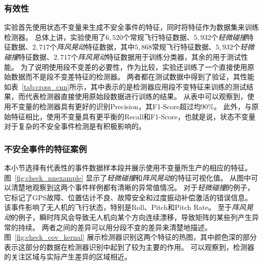 \subsubsection{有效性}  
实验首先使用状态不变量来生成不安全事件的特征，同时将特征作为数据集来训练检测器。
总体上讲，实验使用了$6,520$个常规飞行特征数据、$5,932$个\emph{轻微碰撞}特征数据、$2,717$个\emph{阵风晃动}特征数据，其中$5,868$常规飞行特征数据、$5,932$个\emph{轻微碰撞}特征数据、$2,717$个\emph{阵风晃动}特征数据用于训练分类器，其余的用于测试性能。
为了说明使用段不变差的必要性，作为比较，实验还训练了一个直接使用原始数据而不是段不变差特征的检测器。
两者都在测试数据中得到了验证，其性能如表~\ref{tab:cross_cnn}所示，其中表示的是检测器应用段不变特征来训练的测试结果，而代表检测器直接使用原始段数据进行训练的结果。
从表中可以观察到，使用不变量的检测器具有更好的识别Precision，其F1-Score超过均$90\%$。
此外，与原始特征相比，使用不变量具有更平衡的Recall和F1-Score，也就是说，状态不变量对于复杂的不安全事件检测是有积极影响的。



\subsubsection{不安全事件的特征案例}
本小节选择有代表性的事件数据样本段并展示使用不变量所生产的相应的特征。
图~\ref{fig:check_nnexample} 显示了\emph{轻微碰撞}和\emph{阵风晃动}的特征可视化值。
从图中可以清楚地观察到这两个事件样例都有清晰的异常值情况。
对于\emph{轻微碰撞}的例子，它标记了GPS故障、位置估计不良、故障安全和过度振动补偿激活的错误信息。
该事件影响了无人机的飞行状态，特别是Roll、Pitch和Pitch Rate。
至于\emph{阵风晃动}的例子，瞬时阵风会导致无人机向某个方向连续漂移，导致矩阵的某些列产生异常的持续。
两者之间的差异可以用分段不变的差异来清楚地描述。
图~\ref{fig:check_cov_kernal} 展示检测器识别这两个特征的热图，其中颜色深的部分表示这部分的数据在检测器识别中起到了较为主要的作用。
可以观察到，检测器的关注区域与实际产生差异的区域相近。


